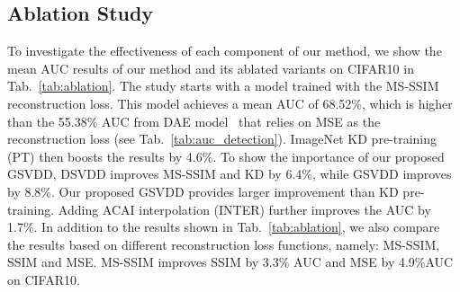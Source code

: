\documentclass[final]{cvpr}
\begin{document}
\subsection{Ablation Study}


To investigate the effectiveness of each component of our method, we show the mean AUC results of our method and its ablated variants on CIFAR10 in Tab.~\ref{tab:ablation}.
The study starts with a model trained with the MS-SSIM reconstruction loss. This model  achieves a mean AUC of 68.52\%, which is higher than the 55.38\% AUC from DAE model~\cite{hadsell2006dimensionality} that relies on MSE as the reconstruction loss (see Tab.~\ref{tab:auc_detection}). 
ImageNet KD pre-training (PT) then boosts the results by 4.6\%.
To show the importance of our proposed GSVDD, DSVDD improves MS-SSIM and KD by 6.4\%, while GSVDD improves by 8.8\%. 
Our proposed GSVDD provides larger improvement than KD pre-training. Adding ACAI interpolation (INTER) further improves the AUC by 1.7\%. In addition to the results shown in Tab.~\ref{tab:ablation}, we also compare the results based on different reconstruction loss functions, namely: MS-SSIM, SSIM and MSE. MS-SSIM improves SSIM by 3.3\% AUC and MSE by 4.9\%AUC on CIFAR10. 

\begin{table}[H]
\centering
{}
\caption{Ablation study of our method on CIFAR10 using anomaly detection mean AUC (MS-SSIM: the backbone deep autoencoder with MS-SSIM loss, PT: knowledge distillation pre-training, DSVDD: Deep SVDD, GSVDD: our Gaussian SVDD, INTER: ACAI interpolation).} \label{tab:ablation}
\end{table}
\end{document}
